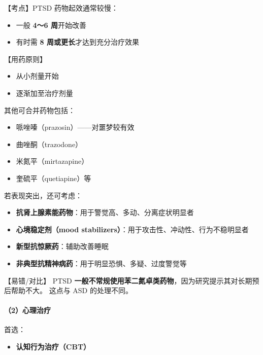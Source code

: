 \documentclass[
  chinese,
  9pt,
  a4paper,
]{ctexart}
\providecommand{\tightlist}{%
  \setlength{\itemsep}{0pt}\setlength{\parskip}{0pt}}
\begin{document}
【考点】PTSD 药物起效通常较慢：

\begin{itemize}
\tightlist
\item
  一般 \textbf{4～6 周}开始改善
\item
  有时需 \textbf{8 周或更长}才达到充分治疗效果
\end{itemize}

【用药原则】

\begin{itemize}
\tightlist
\item
  从小剂量开始
\item
  逐渐加至治疗剂量
\end{itemize}

其他可合并药物包括：

\begin{itemize}
\tightlist
\item
  哌唑嗪（prazosin）------对噩梦较有效
\item
  曲唑酮（trazodone）
\item
  米氮平（mirtazapine）
\item
  奎硫平（quetiapine）等
\end{itemize}

若表现突出，还可考虑：

\begin{itemize}
\tightlist
\item
  \textbf{抗肾上腺素能药物}：用于警觉高、多动、分离症状明显者
\item
  \textbf{心境稳定剂（mood
  stabilizers）}：用于攻击性、冲动性、行为不稳明显者
\item
  \textbf{新型抗惊厥药}：辅助改善睡眠
\item
  \textbf{非典型抗精神病药}：用于明显恐惧、多疑、过度警觉等
\end{itemize}

【易错/对比】 PTSD
\textbf{一般不常规使用苯二氮卓类药物}，因为研究提示其对长期预后帮助不大。
这点与 ASD 的处理不同。

\paragraph{（2）心理治疗}\label{ux5fc3ux7406ux6cbbux7597-1}

首选：

\begin{itemize}
\tightlist
\item
  \textbf{认知行为治疗（CBT）}
\end{itemize}
\end{document}
